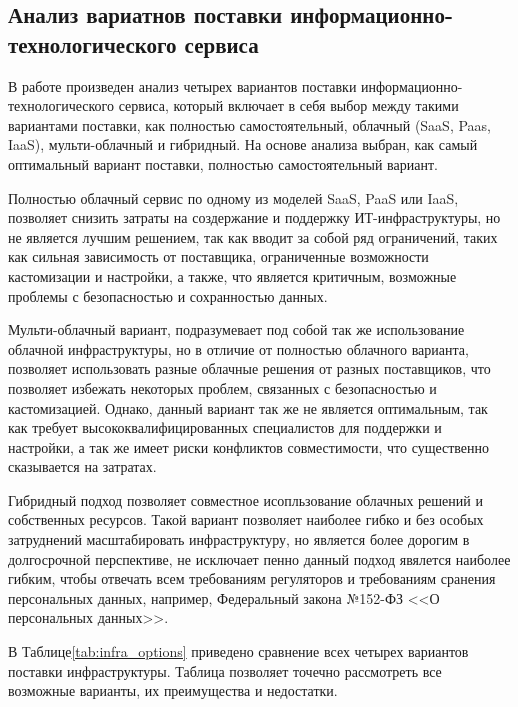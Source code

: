 \documentclass[14pt, a4paper]{extarticle}
\begin{document}
\subsection{Анализ вариатнов поставки информационно-технологического сервиса}

В работе произведен анализ четырех вариантов поставки
информационно-технологического сервиса, который включает в себя выбор между
такими вариантами поставки, как полностью самостоятельный, облачный (SaaS, Paas, IaaS),
мульти-облачный и гибридный. На основе анализа выбран, как самый оптимальный вариант
поставки, полностью самостоятельный вариант.

Полностью облачный сервис \cite{micrasoft-azure-book} по одному из моделей SaaS,
PaaS или IaaS, позволяет снизить затраты на создержание и поддержку ИТ-инфраструктуры,
но не является лучшим решением, так как вводит за собой ряд ограничений, таких как
сильная зависимость от поставщика, ограниченные возможности кастомизации и настройки,
а также, что является критичным, возможные проблемы с безопасностью и сохранностью данных.

Мульти-облачный вариант, подразумевает под собой так же использование облачной
инфраструктуры, но в отличие от полностью облачного варианта, позволяет использовать
разные облачные решения от разных поставщиков, что позволяет избежать
некоторых проблем, связанных с безопасностью и кастомизацией. Однако, данный
вариант так же не является оптимальным, так как требует высококвалифицированных
специалистов для поддержки и настройки, а так же имеет риски конфликтов совместимости,
что существенно сказывается на затратах.

Гибридный подход позволяет совместное исопльзование облачных решений и собственных
ресурсов. Такой вариант позволяет наиболее гибко и без особых затруднений масштабировать
инфраструктуру, но является более дорогим в долгосрочной перспективе, не исключает
пенно данный подход явялется наиболее гибким, чтобы отвечать всем требованиям
регуляторов и требованиям сранения персональных данных, например, Федеральный закона
№152-ФЗ <<О персональных данных>>.

В Таблице\;\ref{tab:infra_options} приведено сравнение всех четырех вариантов поставки
инфраструктуры. Таблица позволяет точечно рассмотреть все возможные варианты, их
преимущества и недостатки.
\end{document}
